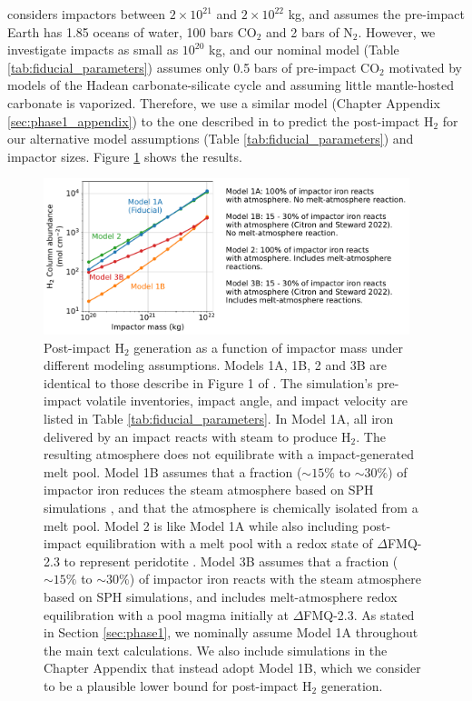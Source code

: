 \citet{Itcovitz_2022} considers impactors between $2 \times 10^{21}$ and $2 \times 10^{22}$ kg, and assumes the pre-impact Earth has 1.85 oceans of water, 100 bars CO$_2$ and 2 bars of N$_2$. However, we investigate impacts as small as $10^{20}$ kg, and our nominal model (Table \ref{tab:fiducial_parameters}) assumes only 0.5 bars of pre-impact CO$_2$ motivated by models of the Hadean carbonate-silicate cycle \citep{Kadoya_2020} and assuming little mantle-hosted carbonate is vaporized. Therefore, we use a similar model (Chapter Appendix \ref{sec:phase1_appendix}) to the one described in \citet{Itcovitz_2022} to predict the post-impact H$_2$ for our alternative model assumptions (Table \ref{tab:fiducial_parameters}) and impactor sizes. Figure \ref{fig:melt_reaction_sup} shows the results.

\begin{figure}
  \centering
  \includegraphics[width=0.95\textwidth]{tex/5impacts/figures/melt_reaction_sup.pdf}
  \caption{Post-impact H$_2$ generation as a function of impactor mass under different modeling assumptions. Models 1A, 1B, 2 and 3B are identical to those describe in Figure 1 of \citet{Itcovitz_2022}. The simulation's pre-impact volatile inventories, impact angle, and impact velocity are listed in Table \ref{tab:fiducial_parameters}. In Model 1A, all iron delivered by an impact reacts with steam to produce H$_2$. The resulting atmosphere does not equilibrate with a impact-generated melt pool. Model 1B assumes that a fraction ($\sim 15\%$ to $\sim 30\%$) of impactor iron reduces the steam atmosphere based on SPH simulations \citep{Citron_2022}, and that the atmosphere is chemically isolated from a melt pool. Model 2 is like Model 1A while also including post-impact equilibration with a melt pool with a redox state of $\Delta$FMQ-2.3 to represent peridotite \citep{Itcovitz_2022}. Model 3B assumes that a fraction ($\sim 15\%$ to $\sim 30\%$) of impactor iron reacts with the steam atmosphere based on SPH simulations, and includes melt-atmosphere redox equilibration with a pool magma initially at $\Delta$FMQ-2.3. As stated in Section \ref{sec:phase1}, we nominally assume Model 1A throughout the main text calculations. We also include simulations in the Chapter Appendix that instead adopt Model 1B, which we consider to be a plausible lower bound for post-impact H$_2$ generation.}
  \label{fig:melt_reaction_sup}
\end{figure}

